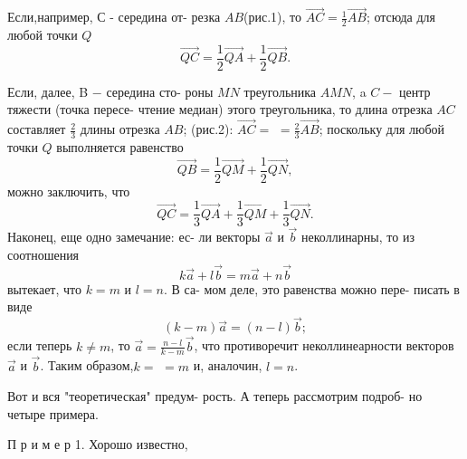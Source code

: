 \documentclass[a4paper]{article}
\begin{document}
\begin{small}
\begin{multicols}{2}
 \par Если,например, $С$ - середина от-\vspace{0.13cm}\linebreak
 резка $AB$(рис.1), то $\overrightarrow{AC} =  \frac{1}{2} \overrightarrow{AB}$;\linebreak
 отсюда для любой точки $Q$ \[\overrightarrow{QC} = \frac{1}{2} \overrightarrow{QA} + \frac{1}{2} \overrightarrow{QB} .\]
 \par Если, далее, B $-$ середина сто-\linebreak
 роны $MN$ треугольника $AMN$, a \linebreak
 $C - $ центр тяжести (точка пересе- \linebreak
 чтение медиан) этого треугольника,\linebreak
 то длина отрезка $AC$ составляет $\frac{2}{3}$ \vspace{0.2cm}\linebreak
 длины отрезка $AB$; (рис.2): $\overrightarrow{AC} = $ \linebreak
 $=\frac{2}{3} \overrightarrow{AB}$; поскольку для любой \linebreak
 точки $Q$ выполняется равенство \[ \overrightarrow{QB} = \frac{1}{2} \overrightarrow{QM} + \frac{1}{2} \overrightarrow{QN}, \]
 можно заключить, что \[ \overrightarrow{QC}=\frac{1}{3} \overrightarrow{QA} + \frac{1}{3} \overrightarrow{QM} +\frac{1}{3} \overrightarrow{QN}.\]
 Наконец, еще одно замечание: ес-\linebreak
 ли векторы $\vec{a}$ и $\vec{b}$ неколлинарны, то \linebreak
 из соотношения \[ k\vec{a} + l\vec{b} = m\vec{a} + n\vec{b}\] вытекает, что $k = m $ и $l = n$. В са-\linebreak
 мом деле, это равенства можно пере-\linebreak
 писать в виде \[ (k-m) \vec{a} = (n-l)\vec{b};\]
 если теперь $k \neq m$, то $\vec{a} = \frac{n-l}{k-m}\vec{b}$,\linebreak
 что противоречит неколлинеарности \linebreak
 векторов $\vec{a}$  и $\vec{b}$. Таким образом,$k = $ \linebreak
 $= m$ и, аналочин, $l = n$.
 \par Вот и вся "теоретическая" предум-\linebreak
 рость. А теперь рассмотрим подроб-\linebreak
 но четыре примера.
 \par П р и м е р 1. Хорошо известно, \linebreak

\end{multicols}
\end{small}
\end{document}
